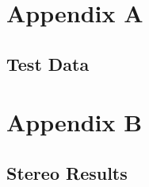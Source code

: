 \makeatletter
\chapter{Appendix A}
\label{AppendixA}

\section{Test Data}



\chapter{Appendix B}
\label{RawQuantitative1}

\section{Stereo Results}
\label{StereoResultsRaw}

